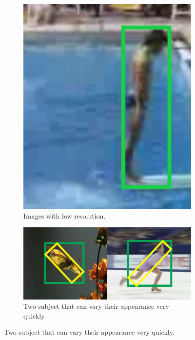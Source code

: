 \begin{figure}[!h]
	\centering
	\begin{subfigure}[!h]{0.19\textwidth}
		\includegraphics[width=\linewidth]{images/tracking/challenge_lowResolution}
		\caption{Images with low resolution.}
		\label{fig:challenge_lowResolution}
	\end{subfigure}
	\begin{subfigure}[!h]{0.54\textwidth}
		\includegraphics[width=\linewidth]{images/tracking/challenge_deformation}
		\caption{Two subject that can vary their appearance very quickly.}

\end{subfigure}
\end{figure}
